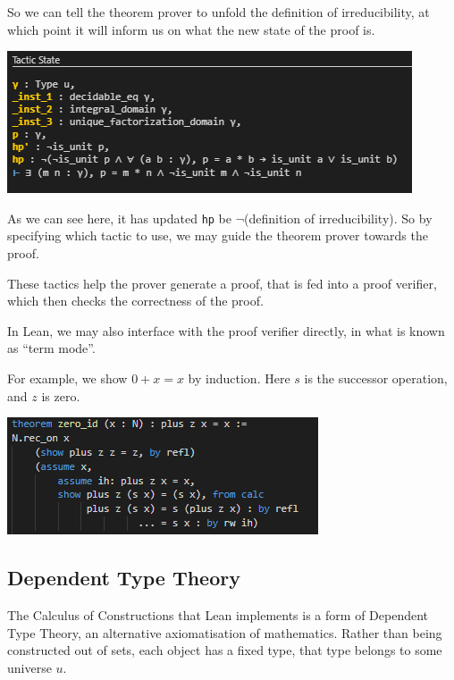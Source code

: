 \documentclass[pagesize=a4]{scrreprt}
\begin{document}
So we can tell the theorem prover to unfold the definition of irreducibility, at which point it will inform us on what the new state of the proof is. 

\smallskip
\begin{center}

\includegraphics{tactic_state.png}

\end{center}
As we can see here, it has updated \texttt{hp} be $\neg$(definition of irreducibility). So by specifying which tactic to use, we may guide the theorem prover towards the proof. 

These tactics help the prover generate a proof, that is fed into a proof verifier, which then checks the correctness of the proof. 

In Lean, we may also interface with the proof verifier directly, in what is known as ``term mode''. 

For example, we show $0 + x = x$ by induction. Here $s$ is the successor operation, and $z$ is zero. 


\smallskip

\begin{center}

\includegraphics{term_example.png}

\end{center}

\subsection{Dependent Type Theory}

The Calculus of Constructions that Lean implements is a form of Dependent Type Theory, an alternative axiomatisation of mathematics. Rather than being constructed out of sets, each object has a fixed type, that type belongs to some universe $u$. 
\end{document}
